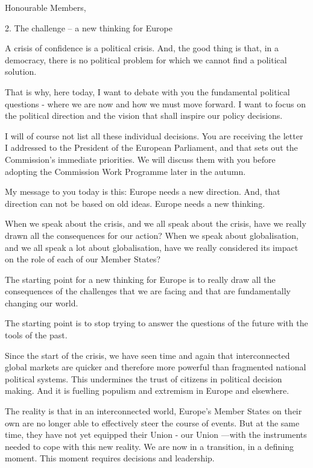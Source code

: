 \documentclass[a4paper,11pt]{article}
\begin{document}
Honourable Members,

2. The challenge – a new thinking for Europe

A crisis of confidence is a political crisis. And, the good thing is that, in a democracy, there is no political problem for which we cannot find a political solution.

That is why, here today, I want to debate with you the fundamental political questions - where we are now and how we must move forward. I want to focus on the political direction and the vision that shall inspire our policy decisions.

I will of course not list all these individual decisions. You are receiving the letter I addressed to the President of the European Parliament, and that sets out the Commission's immediate priorities. We will discuss them with you before adopting the Commission Work Programme later in the autumn.

My message to you today is this: Europe needs a new direction. And, that direction can not be based on old ideas. Europe needs a new thinking.

When we speak about the crisis, and we all speak about the crisis, have we really drawn all the consequences for our action? When we speak about globalisation, and we all speak a lot about globalisation, have we really considered its impact on the role of each of our Member States?

The starting point for a new thinking for Europe is to really draw all the consequences of the challenges that we are facing and that are fundamentally changing our world.

The starting point is to stop trying to answer the questions of the future with the tools of the past.

Since the start of the crisis, we have seen time and again that interconnected global markets are quicker and therefore more powerful than fragmented national political systems. This undermines the trust of citizens in political decision making. And it is fuelling populism and extremism in Europe and elsewhere.

The reality is that in an interconnected world, Europe's Member States on their own are no longer able to effectively steer the course of events. But at the same time, they have not yet equipped their Union - our Union —with the instruments needed to cope with this new reality. We are now in a transition, in a defining moment. This moment requires decisions and leadership.
\end{document}
